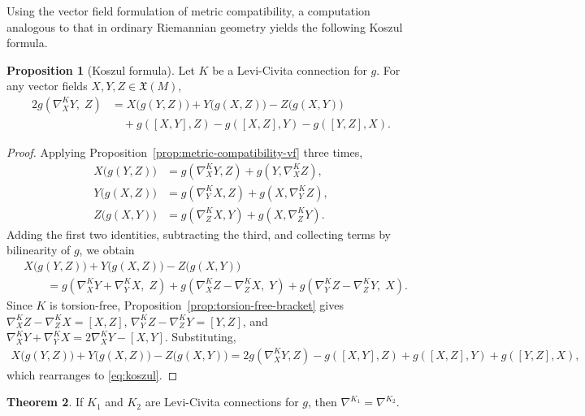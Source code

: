 \documentclass{amsart}
\theoremstyle{definition}
\newtheorem{thm}{Theorem}[section]
\newtheorem{prop}[thm]{Proposition}
\begin{document}
Using the vector field formulation of metric compatibility, a computation
analogous to that in ordinary Riemannian geometry yields the following
Koszul formula.

\begin{prop}[Koszul formula]\label{prop:koszul-formula}
  Let $K$ be a Levi-Civita connection for $g$.
  For any vector fields $X, Y, Z \in \mathfrak{X}(M)$,
  \begin{equation}\label{eq:koszul}
  \begin{aligned}
    2g(\nabla^K_X Y,\; Z)
      &= X\bigl(g(Y,Z)\bigr) + Y\bigl(g(X,Z)\bigr) - Z\bigl(g(X,Y)\bigr) \\
      &\quad + g([X,Y],Z) - g([X,Z],Y) - g([Y,Z],X).
  \end{aligned}
  \end{equation}
\end{prop}

\begin{proof}
  Applying Proposition~\ref{prop:metric-compatibility-vf} three times,
  \begin{align*}
    X\bigl(g(Y,Z)\bigr) &= g(\nabla^K_X Y, Z) + g(Y, \nabla^K_X Z), \\
    Y\bigl(g(X,Z)\bigr) &= g(\nabla^K_Y X, Z) + g(X, \nabla^K_Y Z), \\
    Z\bigl(g(X,Y)\bigr) &= g(\nabla^K_Z X, Y) + g(X, \nabla^K_Z Y).
  \end{align*}
  Adding the first two identities, subtracting the third, and collecting
  terms by bilinearity of $g$, we obtain
  \begin{align*}
    &X\bigl(g(Y,Z)\bigr) + Y\bigl(g(X,Z)\bigr) - Z\bigl(g(X,Y)\bigr) \\
      &\qquad = g(\nabla^K_X Y + \nabla^K_Y X,\; Z)
        + g(\nabla^K_X Z - \nabla^K_Z X,\; Y)
        + g(\nabla^K_Y Z - \nabla^K_Z Y,\; X).
  \end{align*}
  Since $K$ is torsion-free, Proposition~\ref{prop:torsion-free-bracket}
  gives $\nabla^K_X Z - \nabla^K_Z X = [X, Z]$,
  $\nabla^K_Y Z - \nabla^K_Z Y = [Y, Z]$, and
  $\nabla^K_X Y + \nabla^K_Y X = 2\nabla^K_X Y - [X, Y]$. Substituting,
  \begin{align*}
    X\bigl(g(Y,Z)\bigr) + Y\bigl(g(X,Z)\bigr) - Z\bigl(g(X,Y)\bigr)
      = 2g(\nabla^K_X Y, Z) - g([X,Y], Z) + g([X,Z], Y) + g([Y,Z], X),
  \end{align*}
  which rearranges to \eqref{eq:koszul}.
\end{proof}

\begin{thm}\label{thm:uniqueness-cov-deriv}
  If $K_1$ and $K_2$ are Levi-Civita connections for $g$, then
  $\nabla^{K_1} = \nabla^{K_2}$.
\end{thm}
\end{document}
